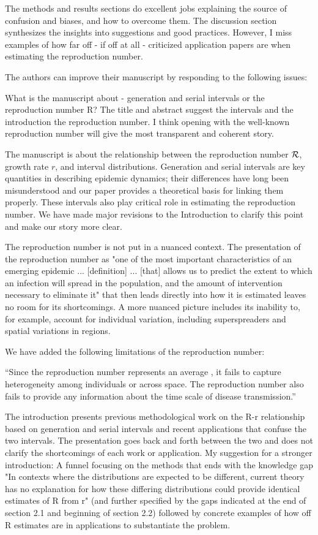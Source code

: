 \documentclass[12pt]{article}
\newcommand{\RR}{\ensuremath{{\cal R}}}
\newcommand{\revtext}{\textsf}
\begin{document}
\revtext{The methods and results sections do excellent jobs explaining the source of confusion and biases, and how to overcome them. The discussion section synthesizes the insights into suggestions and good practices. However, I miss examples of how far off - if off at all - criticized application papers are when estimating the reproduction number.}

\revtext{The authors can improve their manuscript by responding to the following issues:}

\revtext{What is the manuscript about - generation and serial intervals or the reproduction number R? The title and abstract suggest the intervals and the introduction the reproduction number. I think opening with the well-known reproduction number will give the most transparent and coherent story.}

The manuscript is about the relationship between the reproduction number $\RR$, growth rate $r$, and interval distributions. Generation and serial intervals are key quantities in describing epidemic dynamics; their differences have long been misunderstood and our paper provides a theoretical basis for linking them properly. These intervals also play critical role in estimating the reproduction number. We have made major revisions to the Introduction to clarify this point and make our story more clear.

\revtext{The reproduction number is not put in a nuanced context. The presentation of the reproduction number as "one of the most important characteristics of an emerging epidemic ... [definition] ... [that] allows us to predict the extent to which an infection will spread in the population, and the amount of intervention necessary to eliminate it" that then leads directly into how it is estimated leaves no room for its shortcomings. A more nuanced picture includes its inability to, for example, account for individual variation, including superspreaders and spatial variations in regions.}

We have added the following limitations of the reproduction number:

``Since the reproduction number represents an average \citep{diekmann1990definition, anderson1991infectious}, it fails to capture heterogeneity among individuals or across space.
The reproduction number also fails to provide any information about the time scale of disease transmission.''

\revtext{The introduction presents previous methodological work on the R-r relationship based on generation and serial intervals and recent applications that confuse the two intervals. The presentation goes back and forth between the two and does not clarify the shortcomings of each work or application. My suggestion for a stronger introduction: A funnel focusing on the methods that ends with the knowledge gap "In contexts where the distributions are expected to be different, current theory has no explanation for how these differing distributions could provide identical estimates of R from r" (and further specified by the gaps indicated at the end of section 2.1 and beginning of section 2.2) followed by concrete examples of how off R estimates are in applications to substantiate the problem.}
\end{document}
